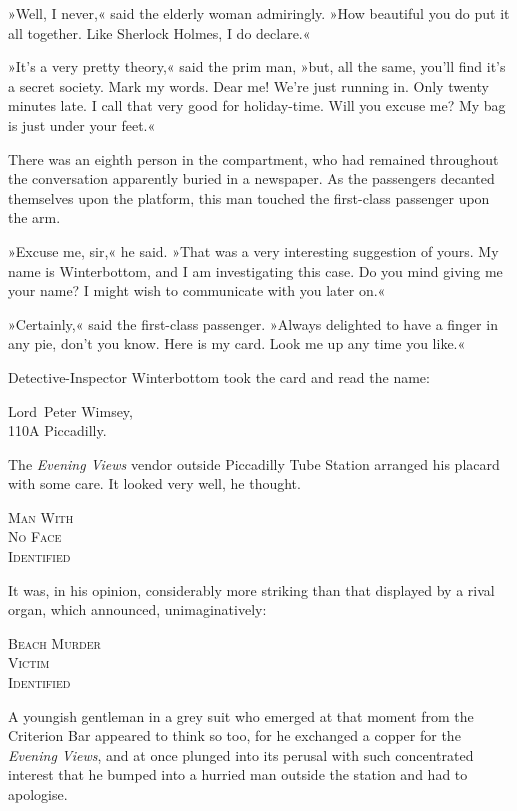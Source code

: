 »Well, I never,« said the elderly woman admiringly. »How beautiful you do put it all together. Like Sherlock Holmes, I do declare.«

»It's a very pretty theory,« said the prim man, »but, all the same, you'll find it's a secret society. Mark my words. Dear me! We're just running in. Only twenty minutes late. I call that very good for holiday-time. Will you excuse me? My bag is just under your feet.«

There was an eighth person in the compartment, who had remained throughout the conversation apparently buried in a newspaper. As the passengers decanted themselves upon the platform, this man touched the first-class passenger upon the arm.

»Excuse me, sir,« he said. »That was a very interesting suggestion of yours. My name is Winterbottom, and I am investigating this case. Do you mind giving me your name? I might wish to communicate with you later on.«

»Certainly,« said the first-class passenger. »Always delighted to have a finger in any pie, don't you know. Here is my card. Look me up any time you like.«

Detective-Inspector Winterbottom took the card and read the name:
\begin{center}
Lord~Peter Wimsey,\\
110A Piccadilly.
\end{center}

The \textit{Evening Views} vendor outside Piccadilly Tube Station arranged his placard with some care. It looked very well, he thought.

\begin{center}\scshape
Man With\\
No Face\\
Identified
\end{center}

It was, in his opinion, considerably more striking than that displayed by a rival organ, which announced, unimaginatively:
\begin{center}\scshape
Beach Murder\\
Victim\\
Identified
\end{center}

A youngish gentleman in a grey suit who emerged at that moment from the Criterion Bar appeared to think so too, for he exchanged a copper for the \textit{Evening Views}, and at once plunged into its perusal with such concentrated interest that he bumped into a hurried man outside the station and had to apologise.

